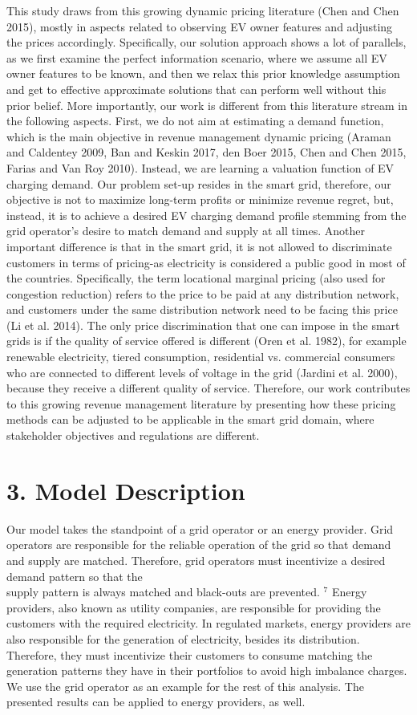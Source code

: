 \documentclass[10pt]{article}
\begin{document}
This study draws from this growing dynamic pricing literature (Chen and Chen 2015), mostly in aspects related to observing EV owner features and adjusting the prices accordingly. Specifically, our solution approach shows a lot of parallels, as we first examine the perfect information scenario, where we assume all EV owner features to be known, and then we relax this prior knowledge assumption and get to effective approximate solutions that can perform well without this prior belief. More importantly, our work is different from this literature stream in the following aspects. First, we do not aim at estimating a demand function, which is the main objective in revenue management dynamic pricing (Araman and Caldentey 2009, Ban and Keskin 2017, den Boer 2015, Chen and Chen 2015, Farias and Van Roy 2010). Instead, we are learning a valuation function of EV charging demand. Our problem set-up resides in the smart grid, therefore, our objective is not to maximize long-term profits or minimize revenue regret, but, instead, it is to achieve a desired EV charging demand profile stemming from the grid operator's desire to match demand and supply at all times. Another important difference is that in the smart grid, it is not allowed to discriminate customers in terms of pricing-as electricity is considered a public good in most of the countries. Specifically, the term locational marginal pricing (also used for congestion reduction) refers to the price to be paid at any distribution network, and customers under the same distribution network need to be facing this price (Li et al. 2014). The only price discrimination that one can impose in the smart grids is if the quality of service offered is different (Oren et al. 1982), for example renewable electricity, tiered consumption, residential vs. commercial consumers who are connected to different levels of voltage in the grid (Jardini et al. 2000), because they receive a different quality of service. Therefore, our work contributes to this growing revenue management literature by presenting how these pricing methods can be adjusted to be applicable in the smart grid domain, where stakeholder objectives and regulations are different.

\section*{3. Model Description}
Our model takes the standpoint of a grid operator or an energy provider. Grid operators are responsible for the reliable operation of the grid so that demand and supply are matched. Therefore, grid operators must incentivize a desired demand pattern so that the\\
supply pattern is always matched and black-outs are prevented. ${ }^{7}$ Energy providers, also known as utility companies, are responsible for providing the customers with the required electricity. In regulated markets, energy providers are also responsible for the generation of electricity, besides its distribution. Therefore, they must incentivize their customers to consume matching the generation patterns they have in their portfolios to avoid high imbalance charges. We use the grid operator as an example for the rest of this analysis. The presented results can be applied to energy providers, as well.
\end{document}
